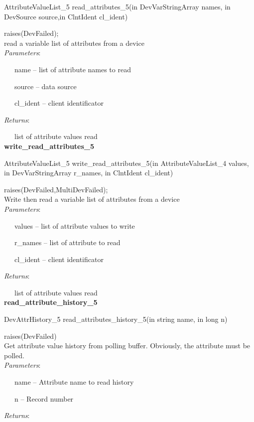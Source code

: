 AttributeValueList\_5 read\_attributes\_5(in DevVarStringArray names,
in DevSource source,in ClntIdent cl\_ident)

raises(DevFailed);\\


read a variable list of attributes from a device\\


\emph{Parameters}:

~~~name -- list of attribute names to read

~~~source -- data source

~~~cl\_ident -- client identificator

\emph{Returns}:

~~~list of attribute values read\\


\textbf{write\_read\_attributes\_5}

AttributeValueList\_5 write\_read\_attributes\_5(in AttributeValueList\_4
values, in DevVarStringArray r\_names, in ClntIdent cl\_ident)

raises(DevFailed,MultiDevFailed);\\


Write then read a variable list of attributes from a device\\


\emph{Parameters}:

~~~values -- list of attribute values to write

~~~r\_names -- list of attribute to read

~~~cl\_ident -- client identificator

\emph{Returns}:

~~~list of attribute values read\textbf{}\\


\textbf{read\_attribute\_history\_5}

DevAttrHistory\_5 read\_attributes\_history\_5(in string name, in
long n)

raises(DevFailed)\\


Get attribute value history from polling buffer. Obviously, the attribute
must be polled.\\


\emph{Parameters}:

~~~name -- Attribute name to read history

~~~n -- Record number

\emph{Returns}:

